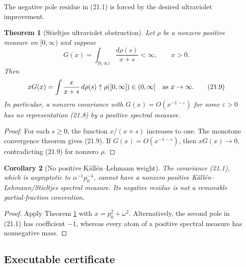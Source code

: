 \documentclass[11pt]{article}
\newtheorem{theorem}{Theorem}[section]
\newtheorem{corollary}[theorem]{Corollary}
\theoremstyle{remark}
\begin{document}
The negative pole residue in (21.1) is forced by the desired ultraviolet
improvement.

\begin{theorem}[Stieltjes ultraviolet obstruction]
\label{thm:v19v18-stieltjes}
Let \(\rho\) be a nonzero positive measure on \([0,\infty)\) and suppose
\[
 G(x)=\int_{[0,\infty)}\frac{d\rho(s)}{x+s}<\infty,
 \qquad x>0.                                                   \tag{21.8}
\]
Then
\[
 xG(x)=\int\frac{x}{x+s}\,d\rho(s)
 \uparrow \rho([0,\infty])\in(0,\infty]
 \quad\hbox{as }x\to\infty.                                   \tag{21.9}
\]
In particular, a nonzero covariance with \(G(x)=O(x^{-1-\varepsilon})\)
for some \(\varepsilon>0\) has no representation (21.8) by a positive
spectral measure.
\end{theorem}

\begin{proof}
For each \(s\geq0\), the function \(x/(x+s)\) increases to one.
The monotone convergence theorem gives (21.9).  If
\(G(x)=O(x^{-1-\varepsilon})\), then \(xG(x)\to0\), contradicting
(21.9) for nonzero \(\rho\).
\end{proof}

\begin{corollary}[No positive K\"allén--Lehmann weight]
\label{cor:v19v18-kl}
The covariance (21.1), which is asymptotic to
\(\alpha^{-1}p_0^{-4}\), cannot have a nonzero positive
K\"allén--Lehmann/Stieltjes spectral measure.  Its negative residue is not
a removable partial-fraction convention.
\end{corollary}

\begin{proof}
Apply Theorem \ref{thm:v19v18-stieltjes} with
\(x=p_0^2+\omega^2\).  Alternatively, the second pole in (21.1) has
coefficient \(-1\), whereas every atom of a positive spectral measure has
nonnegative mass.
\end{proof}

\subsection{Executable certificate}
\end{document}
